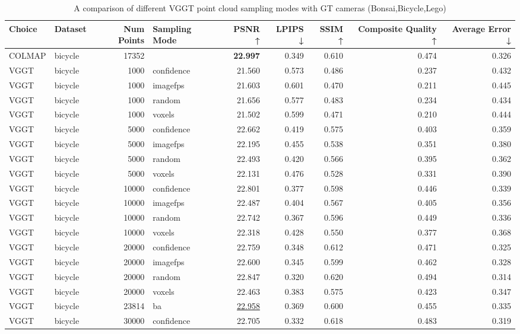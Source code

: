 \begin{table}[H]
\caption{A comparison of different VGGT point cloud sampling modes with GT cameras (Bonsai,Bicycle,Lego)}
\label{tab:03_sampling_mode_gt_cams_bonsai,bicycle,lego}
\small
\begin{tabular}{llrlrrrrr}
\toprule
Choice & Dataset & Num Points & Sampling Mode & PSNR ↑ & LPIPS ↓ & SSIM ↑ & Composite Quality ↑ & Average Error ↓ \\
\midrule
COLMAP & bicycle & 17352 &  & \textbf{22.997} & 0.349 & 0.610 & 0.474 & 0.326 \\
VGGT & bicycle & 1000 & confidence & 21.560 & 0.573 & 0.486 & 0.237 & 0.432 \\
VGGT & bicycle & 1000 & imagefps & 21.603 & 0.601 & 0.470 & 0.211 & 0.445 \\
VGGT & bicycle & 1000 & random & 21.656 & 0.577 & 0.483 & 0.234 & 0.434 \\
VGGT & bicycle & 1000 & voxels & 21.502 & 0.599 & 0.471 & 0.210 & 0.444 \\
VGGT & bicycle & 5000 & confidence & 22.662 & 0.419 & 0.575 & 0.403 & 0.359 \\
VGGT & bicycle & 5000 & imagefps & 22.195 & 0.455 & 0.538 & 0.351 & 0.380 \\
VGGT & bicycle & 5000 & random & 22.493 & 0.420 & 0.566 & 0.395 & 0.362 \\
VGGT & bicycle & 5000 & voxels & 22.131 & 0.476 & 0.528 & 0.331 & 0.390 \\
VGGT & bicycle & 10000 & confidence & 22.801 & 0.377 & 0.598 & 0.446 & 0.339 \\
VGGT & bicycle & 10000 & imagefps & 22.487 & 0.404 & 0.567 & 0.405 & 0.356 \\
VGGT & bicycle & 10000 & random & 22.742 & 0.367 & 0.596 & 0.449 & 0.336 \\
VGGT & bicycle & 10000 & voxels & 22.318 & 0.428 & 0.550 & 0.377 & 0.368 \\
VGGT & bicycle & 20000 & confidence & 22.759 & 0.348 & 0.612 & 0.471 & 0.325 \\
VGGT & bicycle & 20000 & imagefps & 22.600 & 0.345 & 0.599 & 0.462 & 0.328 \\
VGGT & bicycle & 20000 & random & 22.847 & 0.320 & 0.620 & 0.494 & 0.314 \\
VGGT & bicycle & 20000 & voxels & 22.463 & 0.383 & 0.575 & 0.423 & 0.347 \\
VGGT & bicycle & 23814 & ba & \underline{22.958} & 0.369 & 0.600 & 0.455 & 0.335 \\
VGGT & bicycle & 30000 & confidence & 22.705 & 0.332 & 0.618 & 0.483 & 0.319 \\

\end{tabular}
\end{table}

